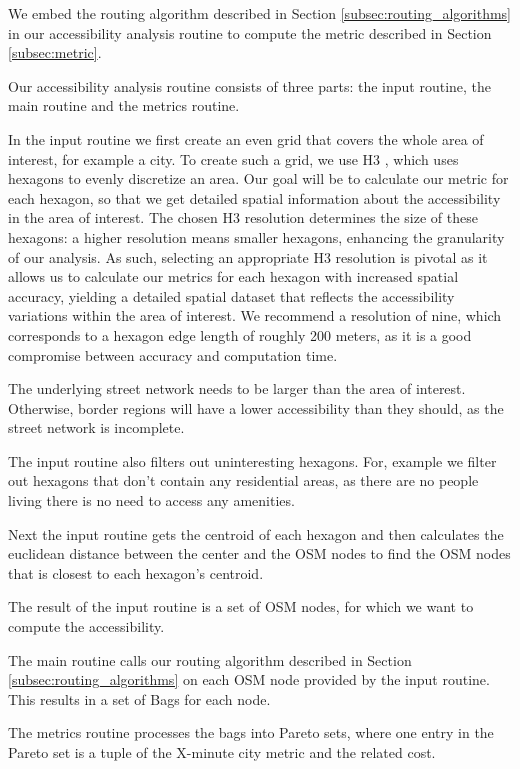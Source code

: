 We embed the routing algorithm described in Section \ref{subsec:routing_algorithms} in our accessibility analysis routine to compute the metric described in Section \ref{subsec:metric}.

Our accessibility analysis routine consists of three parts: the input routine, the main routine and the metrics routine.

In the input routine we first create an even grid that covers the whole area of interest, for example a city.
To create such a grid, we use H3 , which uses hexagons to evenly discretize an area.
Our goal will be to calculate our metric for each hexagon, so that we get detailed spatial information about the accessibility in the area of interest.
The chosen H3 resolution determines the size of these hexagons: a higher resolution means smaller hexagons, enhancing the granularity of our analysis. 
As such, selecting an appropriate H3 resolution is pivotal as it allows us to calculate our metrics for each hexagon with increased spatial accuracy, yielding a detailed spatial dataset that reflects the accessibility variations within the area of interest.
We recommend a resolution of nine, which corresponds to a hexagon edge length of roughly 200 meters, as it is a good compromise between accuracy and computation time.

The underlying street network needs to be larger than the area of interest.
Otherwise, border regions will have a lower accessibility than they should, as the street network is incomplete.

The input routine also filters out uninteresting hexagons.
For, example we filter out hexagons that don't contain any residential areas, as there are no people living there is no need to access any amenities.

Next the input routine gets the centroid of each hexagon and then calculates the euclidean distance between the center and the OSM nodes to find the OSM nodes that is closest to each hexagon's centroid.

The result of the input routine is a set of OSM nodes, for which we want to compute the accessibility.


The main routine calls our routing algorithm described in Section \ref{subsec:routing_algorithms} on each OSM node provided by the input routine.
This results in a set of Bags for each node.

The metrics routine processes the bags into Pareto sets, where one entry in the Pareto set is a tuple of the X-minute city metric and the related cost.

